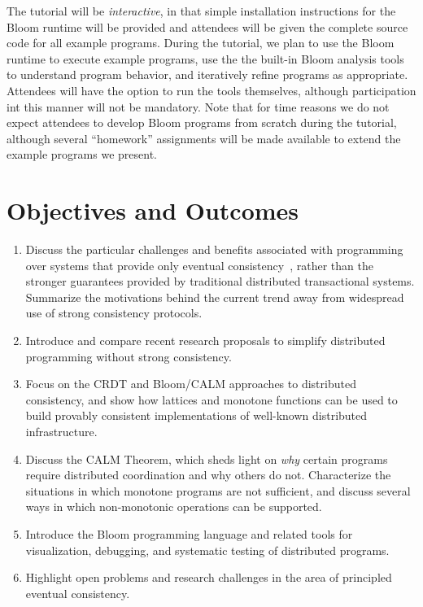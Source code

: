 The tutorial will be \emph{interactive}, in that simple installation
instructions for the Bloom runtime will be provided and attendees will be given
the complete source code for all example programs. During the tutorial, we plan
to use the Bloom runtime to execute example programs, use the the built-in Bloom
analysis tools to understand program behavior, and iteratively refine programs
as appropriate. Attendees will have the option to run the tools themselves,
although participation int this manner will not be mandatory. Note that for time
reasons we do not expect attendees to develop Bloom programs from scratch during
the tutorial, although several ``homework'' assignments will be made available to
extend the example programs we present.

\section{Objectives and Outcomes}

\begin{enumerate}
\item
  Discuss the particular challenges and benefits associated with programming
  over systems that provide only eventual
  consistency~\cite{DeCandia2007,Terry1995,vogels}, rather than the stronger
  guarantees provided by traditional distributed transactional systems.
  Summarize the motivations behind the current trend away from widespread use of
  strong consistency protocols.
\item
  Introduce and compare recent research proposals to simplify distributed
  programming without strong consistency.
\item
  Focus on the CRDT and Bloom/CALM approaches to distributed
  consistency, and show how lattices and monotone functions can be used to build
  provably consistent implementations of well-known distributed infrastructure.
\item
  Discuss the CALM Theorem, which sheds light on \emph{why} certain programs
  require distributed coordination and why others do not.  Characterize the
  situations in which monotone programs are not sufficient, and discuss several
  ways in which non-monotonic operations can be supported.
\item
  Introduce the Bloom programming language and related tools for visualization,
  debugging, and systematic testing of distributed programs.
\item
  Highlight open problems and research challenges in the area of principled
  eventual consistency.
\end{enumerate}

